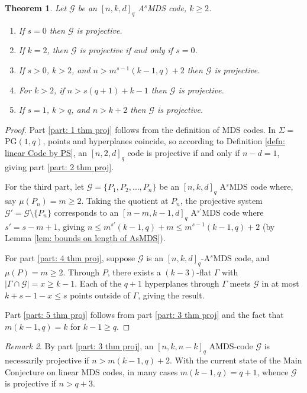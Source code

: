 \documentclass[11pt,a4paper]{amsart}
\newcommand{\AS}{ A$^s$MDS }
\newcommand{\G}{\mathcal{G}}
\theoremstyle{plain}
\newtheorem{theorem}{Theorem}[section]
\theoremstyle{definition}
\theoremstyle{remark}
\newtheorem{remark}[theorem]{Remark}
\begin{document}
	\begin{theorem}\label{thm-Projective}
		Let $\G$ be an $[n,k,d]_q$ \AS code, $k\ge 2$.
		\begin{enumerate}
			\item If $s=0$ then $\G$ is projective.\label{part: 1 thm proj}
			\item If $k=2$, then $\G$ is projective if and only if $s=0$. \label{part: 2 thm proj}
			\item If $s>0$, $k>2$, and $n> m^{s-1}(k-1,q)+2$ then $\G$ is projective. \label{part: 3 thm proj}
			\item For $k>2$, if  $n> s(q+1)+k-1$  then $\G$ is projective. \label{part: 4 thm proj}
			\item If $s=1$, $k>q$, and $n> k+2$  then $\G$ is projective. \label{part: 5 thm proj}
		\end{enumerate}
	\end{theorem}
	\begin{proof}
		Part \ref{part: 1 thm proj} follows from the definition of MDS codes. In $\Sigma=$ PG$(1,q)$, points and hyperplanes coincide, so according to Definition \ref{defn: linear Code by PS},  an $[n,2,d]_q$ code is projective if and only if $n-d=1$, giving part \ref{part: 2 thm proj}.

		For the third part, let $\G=\{P_1,P_2,\ldots,P_n\}$ be an $[n,k,d]_q$ \AS code where, say $\mu(P_n)=m\ge2$. Taking the quotient at $P_n$, the projective system $\G'=\G\setminus \{P_n\}$ corresponds to an $[n-m, k-1,d]_q$ A$^{s'}$MDS code where $s'=s-m+1$, giving $n\le m^{s'}(k-1,q)+m\le m^{s-1}(k-1,q)+2$ (by Lemma \ref{lem: bounds on length of AsMDS}).

		For part \ref{part: 4 thm proj}, suppose $\G$ is an $[n,k,d]_q$-A$^s$MDS code, and $ \mu(P)=m\ge 2$. Through $P$, there exists a $(k-3)$-flat $\Gamma$ with $|\Gamma \cap \G|=x\ge k-1$.  Each of the $q+1$ hyperplanes through $\Gamma$ meets $\G$ in at most $k+s-1-x\le s$ points outside of $\Gamma$, giving the result.

		Part \ref{part: 5 thm proj} follows from part \ref{part: 3 thm proj} and the fact that $m(k-1,q)=k$ for $k-1\ge q$.
	\end{proof}

	\begin{remark}
		By part \ref{part: 3 thm proj}, an $[n,k,n-k]_q$ AMDS-code $\G$ is necessarily projective if $n>m(k-1,q)+2$.  With the current state of the Main Conjecture on linear MDS codes, in many cases $m(k-1,q)=q+1$, whence $\G$ is projective if $n>q+3$.
	\end{remark}
\end{document}
